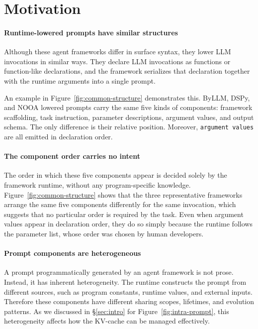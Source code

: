 \section{Motivation}
\label{sec:motivation}
\paragraph{Runtime-lowered prompts have similar structures}
Although these agent frameworks differ in surface syntax, they lower LLM invocations in similar ways. They declare LLM invocations as functions or function-like declarations, and the framework serializes that declaration together with the runtime arguments into a single prompt.

An example in Figure~\ref{fig:common-structure} demonstrates this. ByLLM, DSPy, and NOOA lowered prompts carry the same five kinds of components: framework scaffolding, task instruction, parameter descriptions, argument values, and output schema. The only difference is their relative position. Moreover, \texttt{argument values} are all emitted in declaration order.


\paragraph{The component order carries no intent}
The order in which these five components appear is decided solely by the framework runtime, without any program-specific knowledge. Figure~\ref{fig:common-structure} shows that the three representative frameworks arrange the same five components differently for the same invocation, which suggests that no particular order is required by the task. Even when argument values appear in declaration order, they do so simply because the runtime follows the parameter list, whose order was chosen by human developers. 

\paragraph{Prompt components are heterogeneous}
\label{sec:heterogeneity}
A prompt programmatically generated by an agent framework is not prose. Instead, it has inherent heterogeneity. The runtime constructs the prompt from different sources, such as program constants, runtime values, and external inputs. Therefore these components have different sharing scopes, lifetimes, and evolution patterns. As we discussed in \S\ref{sec:intro} for Figure~\ref{fig:intra-prompt}, this heterogeneity affects how the KV-cache can be managed effectively. 


